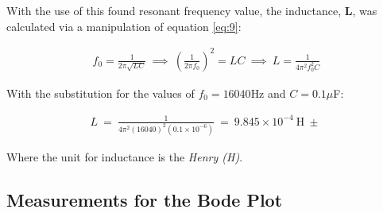 \documentclass[12pt]{article}
\begin{document}
With the use of this found resonant frequency value, the inductance, \textbf{L}, was calculated via a manipulation of equation \ref{eq:9}:

\begin{gather} \label{eq:16}
    f_0 = \frac{1}{2 \pi \sqrt{LC}} \: \implies \: \left( \frac{1}{2 \pi f_0} \right)^2 = LC \: \implies \:
    L = \frac{1}{4 \pi^2 f_0^2 C}
\end{gather}

With the substitution for the values of $f_0 = 16040$Hz and $C = 0.1 \mu$F:

\begin{gather} \label{eq:17}
    L \: = \: \frac{1}{4 \pi^2 (16040)^2 (0.1 \times 10^{-6})} \: = \: 9.845 \times 10^{-4} \: \text{H} \: \pm \: 
\end{gather}

Where the unit for inductance is the \textit{Henry (H)}.

\subsection{Measurements for the Bode Plot} \label{sec:3.2}

\renewcommand{\arraystretch}{1.3}
\end{document}
